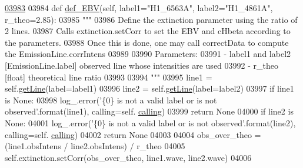 \begin{DoxyCode}
\hypertarget{classpyneb_1_1core_1_1pynebcore_1_1_observation_l03983}{}\hyperlink{classpyneb_1_1core_1_1pynebcore_1_1_observation_ab01150e82809bd712a1b1f09d250db94}{03983} 
03984     \textcolor{keyword}{def }\hyperlink{classpyneb_1_1core_1_1pynebcore_1_1_observation_ab01150e82809bd712a1b1f09d250db94}{def\_EBV}(self, label1="H1\_6563A", label2="H1\_4861A", r\_theo=2.85):
03985         \textcolor{stringliteral}{"""}
03986 \textcolor{stringliteral}{        Define the extinction parameter using the ratio of 2 lines.}
03987 \textcolor{stringliteral}{        Calls extinction.setCorr to set the EBV and cHbeta according to the parameters.}
03988 \textcolor{stringliteral}{        Once this is done, one may call correctData to compute the EmissionLine.corrIntens}
03989 \textcolor{stringliteral}{        }
03990 \textcolor{stringliteral}{        Parameters:}
03991 \textcolor{stringliteral}{            - label1 and label2 [EmissionLine.label] observed line whose intensities are used}
03992 \textcolor{stringliteral}{            - r\_theo [float] theoretical line ratio}
03993 \textcolor{stringliteral}{}
03994 \textcolor{stringliteral}{        """}
03995         line1 = self.\hyperlink{classpyneb_1_1core_1_1pynebcore_1_1_observation_a9994c84a500a6a31a5376ed6c7782ce3}{getLine}(label=label1)
03996         line2 = self.\hyperlink{classpyneb_1_1core_1_1pynebcore_1_1_observation_a9994c84a500a6a31a5376ed6c7782ce3}{getLine}(label=label2)
03997         \textcolor{keywordflow}{if} line1 \textcolor{keywordflow}{is} \textcolor{keywordtype}{None}:
03998             log\_.error(\textcolor{stringliteral}{'\{0\} is not a valid label or is not observed'}.format(line1), calling=self.
      \hyperlink{classpyneb_1_1core_1_1pynebcore_1_1_observation_a2639fad9af4fefad20e4097295bd40e7}{calling})
03999             \textcolor{keywordflow}{return} \textcolor{keywordtype}{None}
04000         \textcolor{keywordflow}{if} line2 \textcolor{keywordflow}{is} \textcolor{keywordtype}{None}:
04001             log\_.error(\textcolor{stringliteral}{'\{0\} is not a valid label or is not observed'}.format(line2), calling=self.
      \hyperlink{classpyneb_1_1core_1_1pynebcore_1_1_observation_a2639fad9af4fefad20e4097295bd40e7}{calling})
04002             \textcolor{keywordflow}{return} \textcolor{keywordtype}{None}
04003 
04004         obs\_over\_theo = (line1.obsIntens / line2.obsIntens) / r\_theo 
04005         self.extinction.setCorr(obs\_over\_theo, line1.wave, line2.wave)
04006         
 
\end{DoxyCode}
